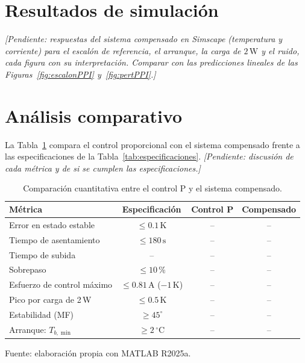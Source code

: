 \documentclass[journal,twocolumn]{IEEEtran}
\newcommand{\tableformat}{\footnotesize\setlength{\tabcolsep}{3pt}\renewcommand{\arraystretch}{1.15}}
\newcommand{\pendiente}[1]{\textit{[Pendiente: #1]}}
\begin{document}
\section{Resultados de simulación}\label{sec:resultados}
\pendiente{respuestas del sistema compensado en Simscape (temperatura y corriente) para el escalón de referencia, el arranque, la carga de $2\,\mathrm W$ y el ruido, cada figura con su interpretación. Comparar con las predicciones lineales de las Figuras~\ref{fig:escalonPPI} y~\ref{fig:pertPPI}.}

\section{Análisis comparativo}\label{sec:comparacion}
La Tabla~\ref{tab:comparacion} compara el control proporcional con el sistema compensado frente a las especificaciones de la Tabla~\ref{tab:especificaciones}. \pendiente{discusión de cada métrica y de si se cumplen las especificaciones.}

\begin{table}[!tbp]\centering
\caption{Comparación cuantitativa entre el control P y el sistema compensado.}\label{tab:comparacion}
{\tableformat
\begin{tabular}{@{}lccc@{}}\toprule
Métrica & Especificación & Control P & Compensado\\\midrule
Error en estado estable & $\le0.1\,\mathrm K$ & -- & --\\
Tiempo de asentamiento & $\le180\,\mathrm s$ & -- & --\\
Tiempo de subida & -- & -- & --\\
Sobrepaso & $\le10\,\%$ & -- & --\\
Esfuerzo de control máximo & $\le0.81\,\mathrm A$ ($-1\,\mathrm K$) & -- & --\\
Pico por carga de 2\,W & $\le0.5\,\mathrm K$ & -- & --\\
Estabilidad (MF) & $\ge45^\circ$ & -- & --\\
Arranque: $T_{b,\min}$ & $\ge2\,^\circ\mathrm C$ & -- & --\\\bottomrule
\end{tabular}}
\par\smallskip\footnotesize Fuente: elaboración propia con MATLAB R2025a.
\end{table}
\end{document}
